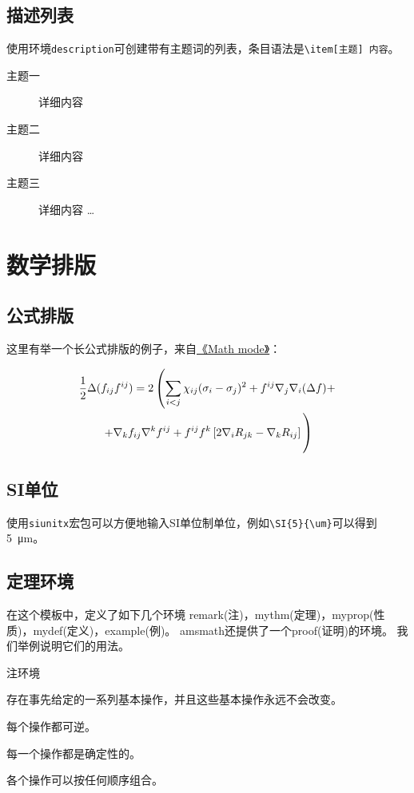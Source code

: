 \subsection{描述列表}
使用环境\verb+description+可创建带有主题词的列表，条目语法是\verb+\item[主题] 内容+。
\begin{description}
	\item[主题一] 详细内容
	\item[主题二] 详细内容
	\item[主题三] 详细内容 \ldots
\end{description}

\section{数学排版}

\subsection{公式排版}

这里有举一个长公式排版的例子，来自\href{http://www.tex.ac.uk/tex-archive/info/math/voss/mathmode/Mathmode.pdf}{《Math mode》}：

\begin {multline}
\frac {1}{2}\Delta (f_{ij}f^{ij})=
2\left (\sum _{i<j}\chi _{ij}(\sigma _{i}-
\sigma _{j}) ^{2}+ f^{ij}\nabla _{j}\nabla _{i}(\Delta f)+\right .\\
\left .+\nabla _{k}f_{ij}\nabla ^{k}f^{ij}+
f^{ij}f^{k}\left [2\nabla _{i}R_{jk}-
\nabla _{k}R_{ij}\right ]\vphantom {\sum _{i<j}}\right )
\end{multline}

\subsection{SI单位}

使用\verb+siunitx+宏包可以方便地输入SI单位制单位，例如\verb+\SI{5}{\um}+可以得到\SI{5}{\um}。

\subsection{定理环境}

在这个模板中，定义了如下几个环境
remark(注)，mythm(定理)，myprop(性质)，mydef(定义)，example(例)。
amsmath还提供了一个proof(证明)的环境。
我们举例说明它们的用法。

注环境
\begin{remark}
	存在事先给定的一系列基本操作，并且这些基本操作永远不会改变。
\end{remark}
\begin{remark}
	每个操作都可逆。
	\label{o1.2}
\end{remark}
\begin{remark}
	每一个操作都是确定性的。
\end{remark}
\begin{remark}
	各个操作可以按任何顺序组合。
\end{remark}

